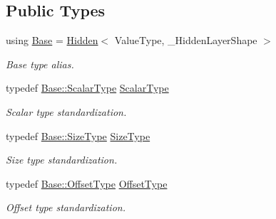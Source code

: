 \subsection*{Public Types}
\begin{DoxyCompactItemize}
\item 
using \hyperlink{classffnn_1_1layer_1_1_activation_a2f462178d98a5439e13962796c483459}{Base} = \hyperlink{classffnn_1_1layer_1_1_hidden}{Hidden}$<$ Value\-Type, \-\_\-\-Hidden\-Layer\-Shape $>$
\begin{DoxyCompactList}\small\item\em Base type alias. \end{DoxyCompactList}\item 
typedef \hyperlink{classffnn_1_1layer_1_1internal_1_1_interface_a7f834e3365e5199bcbcd16d9abd63941}{Base\-::\-Scalar\-Type} \hyperlink{classffnn_1_1layer_1_1_activation_a4ca1ce43c5be7e5b8950af7cb262daca}{Scalar\-Type}
\begin{DoxyCompactList}\small\item\em Scalar type standardization. \end{DoxyCompactList}\item 
typedef \hyperlink{classffnn_1_1layer_1_1_hidden_ac148012cb544a39841675601090cd4c8}{Base\-::\-Size\-Type} \hyperlink{classffnn_1_1layer_1_1_activation_a6a7b6dd86eb70b72a179ce9951fb1149}{Size\-Type}
\begin{DoxyCompactList}\small\item\em Size type standardization. \end{DoxyCompactList}\item 
typedef \hyperlink{classffnn_1_1layer_1_1_hidden_ae2409b970adafb0ebc9b2eec62c4aac4}{Base\-::\-Offset\-Type} \hyperlink{classffnn_1_1layer_1_1_activation_aac891b2d2a76bcf6035f53ed6abb94dc}{Offset\-Type}
\begin{DoxyCompactList}\small\item\em Offset type standardization. \end{DoxyCompactList}\end{DoxyCompactItemize}
